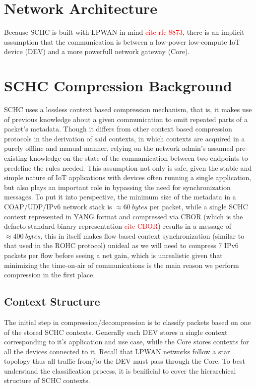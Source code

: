 \documentclass[cspaper]{IEEEtran}
\numberwithin{equation}{subsection}
\begin{document}
\section{Network Architecture}
	\par{
		Because SCHC is built with LPWAN in mind \textcolor{red}{cite rfc 8873}, there is an implicit assumption that the communication is between
		a low-power low-compute IoT device (DEV) and a more powerfull network gateway (Core).
	}
\section{SCHC Compression  Background}
	

	\par{
		SCHC uses a lossless context based compression mechanism, that is, it makes use of previous knowledge
		about a given communication to omit repeated parts of a packet's metadata. Though it
		differs from other context based compression protocols in the derivation of said contexts,
		in which contexts are acquired in a purely offline and manual manner, relying on the network admin's assumed
		pre-existing knowledge on the state of the communication between two endpoints to predefine the rules needed.
		This assumption not only is safe, given the stable and simple nature of IoT applications with devices often running a single application, but
		also plays an important role in bypassing the need for synchronization messages. To put it into perspective, the minimum size of the metadata in a 
		COAP/UDP/IPv6 network stack is $\approx 60 \ bytes$ per packet, while a single SCHC context represented in YANG format and compressed via CBOR 
		(which is the defacto-standard binary representation \textcolor{red}{cite CBOR}) results in 
		a message of $\approx 400 \ bytes$, this in itself makes flow based context synchronization (similar to that used in the ROHC protocol) unideal as we will need to compress
		7 IPv6 packets per flow before seeing a net gain, which is unrealistic given that minimizing the time-on-air of communications is 
		the main reason we perform compression in the first place.
	}
	
	\vspace{1em}
\subsection{Context Structure}
	\par{
		The initial step in compression/decompression is to classify packets based on one of the stored SCHC contexts. Generally each DEV stores a single
		context corresponding to it's application and use case, while the Core stores contexts for all the devices connected to it. Recall that LPWAN networks follow a star topology
		thus all traffic from/to the DEV must pass through the Core. To best understand the classification process, it is benificial to cover the 
		hierarchical structure of SCHC contexts.
	}
\end{document}
